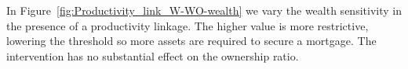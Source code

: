 In Figure~\ref{fig:Productivity_link_W-WO-wealth} %
we vary the wealth sensitivity in the presence of a productivity linkage. The higher value is more restrictive, lowering the threshold so more assets are required to secure a mortgage. %
The intervention has no substantial effect on the ownership ratio. %
